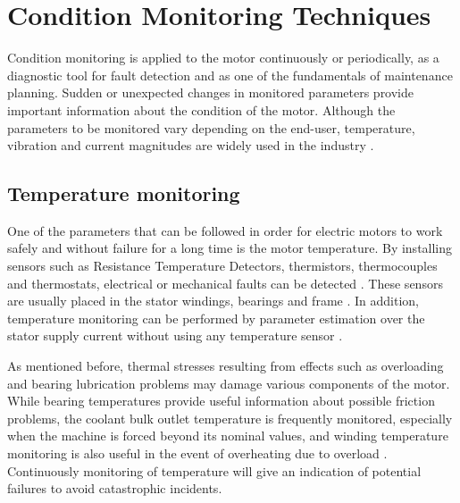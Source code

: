 		
		

\section{Condition Monitoring Techniques}

Condition monitoring is applied to the motor continuously or periodically, as a diagnostic tool for fault detection and as one of the fundamentals of maintenance planning. Sudden or unexpected changes in monitored parameters provide important information about the condition of the motor. Although the parameters to be monitored vary depending on the end-user, temperature, vibration and current magnitudes are widely used in the industry \cite{mistry2016rotating}.

\subsection{Temperature monitoring}

One of the parameters that can be followed in order for electric motors to work safely and without failure for a long time is the motor temperature. By installing sensors such as Resistance Temperature Detectors, thermistors, thermocouples and thermostats, electrical or mechanical faults can be detected \cite{mistry2016rotating}. These sensors are usually placed in the stator windings, bearings and frame \cite{ieee2017}. In addition, temperature monitoring can be performed by parameter estimation over the stator supply current without using any temperature sensor \cite{kumar2019comprehensive}.

As mentioned before, thermal stresses resulting from effects such as overloading and bearing lubrication problems may damage various components of the motor. While bearing temperatures provide useful information about possible friction problems, the coolant bulk outlet temperature is frequently monitored, especially when the machine is forced beyond its nominal values, and winding temperature monitoring is also useful in the event of overheating due to overload \cite{thorsen1998methods}. Continuously monitoring of temperature will give an indication of potential failures to avoid catastrophic incidents.

